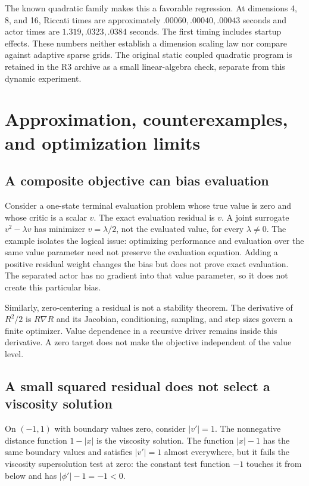 The known quadratic family makes this a favorable regression. At dimensions 4, 8, and 16, Riccati times are approximately $.00060,.00040,.00043$ seconds and actor times are $1.319,.0323,.0384$ seconds. The first timing includes startup effects. These numbers neither establish a dimension scaling law nor compare against adaptive sparse grids. The original static coupled quadratic program is retained in the R3 archive as a small linear-algebra check, separate from this dynamic experiment.

\section{Approximation, counterexamples, and optimization limits}
\label{app:limits}
\subsection{A composite objective can bias evaluation}
Consider a one-state terminal evaluation problem whose true value is zero and whose critic is a scalar $v$. The exact evaluation residual is $v$. A joint surrogate $v^2-\lambda v$ has minimizer $v=\lambda/2$, not the evaluated value, for every $\lambda\ne0$. The example isolates the logical issue: optimizing performance and evaluation over the same value parameter need not preserve the evaluation equation. Adding a positive residual weight changes the bias but does not prove exact evaluation. The separated actor has no gradient into that value parameter, so it does not create this particular bias.

Similarly, zero-centering a residual is not a stability theorem. The derivative of $R^2/2$ is $R\nabla R$ and its Jacobian, conditioning, sampling, and step sizes govern a finite optimizer. Value dependence in a recursive driver remains inside this derivative. A zero target does not make the objective independent of the value level.

\subsection{A small squared residual does not select a viscosity solution}
On $(-1,1)$ with boundary values zero, consider $|v'|=1$. The nonnegative distance function $1-|x|$ is the viscosity solution. The function $|x|-1$ has the same boundary values and satisfies $|v'|=1$ almost everywhere, but it fails the viscosity supersolution test at zero: the constant test function $-1$ touches it from below and has $|\phi'|-1=-1<0$.

